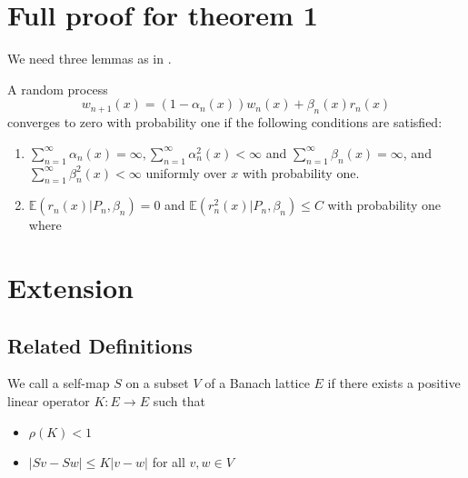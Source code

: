 \section{Full proof for theorem 1}

We need three lemmas as in \cite{jaakkola1993convergence}.

\begin{lemma}
A random process 
$$
w_{n+1}(x) = (1-\alpha_n(x))w_n(x)+\beta_n(x)r_n(x)
$$
converges to zero with probability one if the following conditions are satisfied:
\begin{enumerate}
    \item $\sum_{n=1}^\infty \alpha_n(x) = \infty, \sum_{n=1}^\infty \alpha_n^2(x)<\infty$ and $\sum_{n=1}^\infty \beta_n(x) = \infty$, and $\sum_{n=1}^\infty \beta_n^2(x)<\infty$ uniformly over $x$ with probability one.
    \item $\mathbb{E}(r_n(x)|P_n,\beta_n) = 0$ and $\mathbb{E}(r_n^2(x)|P_n,\beta_n)\le C$ with probability one where
\end{enumerate}
    
\end{lemma}

\section{Extension}
\subsection{Related Definitions}
\begin{definition}
We call a self-map $S$ on a subset $V$ of a Banach lattice $E$ if there exists a positive linear operator $K:E \to E$ such that
\begin{itemize}
    \item $\rho(K)<1$ 
    \item $|Sv-Sw|\le K|v-w|$  for all $v,w\in V$
\end{itemize}
    
\end{definition}